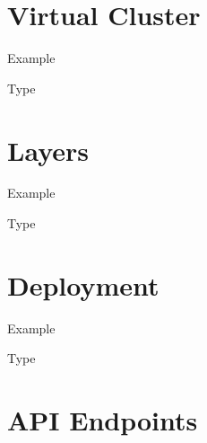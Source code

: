 \documentclass[11pt]{article}
\begin{document}
\section{Virtual Cluster}

Example

\begin{quote}

\end{quote}

Type

\begin{quote}

\end{quote}

\section{Layers}

Example

\begin{quote}

\end{quote}

Type

\begin{quote}

\end{quote}

\section{Deployment}

Example

\begin{quote}

\end{quote}

Type

\begin{quote}

\end{quote}

\section{API Endpoints}
\end{document}
